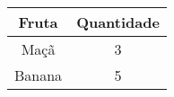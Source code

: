 \documentclass[10pt]{article}
\begin{document}
\begin{learng}
\begin{tabular}{cc}
\hline
\textbf{Fruta} & \textbf{Quantidade} \\
\hline
Maçã & 3 \\
\hline
Banana & 5 \\
\hline
\end{tabular}
\end{learng}
\end{document}
